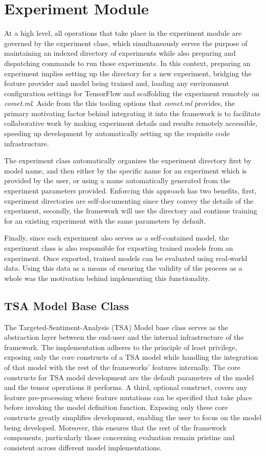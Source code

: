 \documentclass[12pt, a4paper]{report}
\theoremstyle{definition}
\theoremstyle{definition}%
\theoremstyle{definition}%
\theoremstyle{definition}%
\theoremstyle{definition}%
\theoremstyle{definition}%
\begin{document}
\section{Experiment Module}
At a high level, all operations that take place in the experiment module are governed by the experiment class, which simultaneously serves the purpose of maintaining an indexed directory of experiments while also preparing and dispatching commands to run those experiments. In this context, preparing an experiment implies setting up the directory for a new experiment, bridging the feature provider and model being trained and, loading any environment configuration settings for TensorFlow and scaffolding the experiment remotely on \textit{comet.ml}. Aside from the this tooling options that \textit{comet.ml} provides, the primary motivating factor behind integrating it into the framework is to facilitate collaborative work by making experiment details and results remotely accessible, speeding up development by automatically setting up the requisite code infrastructure.

The experiment class automatically organizes the experiment directory first by model name, and then either by the specific name for an experiment which is provided by the user, or using a name automatically generated from the experiment parameters provided. Enforcing this approach has two benefits, first, experiment directories are self-documenting since they convey the details of the experiment, secondly, the framework will use the directory and continue training for an existing experiment with the same parameters by default.

Finally, since each experiment also serves as a self-contained model, the experiment class is also responsible for exporting trained models from an experiment. Once exported, trained models can be evaluated using real-world data. Using this data as a means of ensuring the validity of the process as a whole was the motivation behind implementing this functionality.

\subsection{TSA Model Base Class}
The Targeted-Sentiment-Analysis (TSA) Model base class serves as the abstraction layer between the end-user and the internal infrastructure of the framework. The implementation adheres to the principle of least privilege, exposing only the core constructs of a TSA model while handling the integration of that model with the rest of the frameworks' features internally. The core constructs for TSA model development are the default parameters of the model and the tensor operations it performs. A third, optional construct, covers any feature pre-processing where feature mutations can be specified that take place before invoking the model definition function. Exposing only these core constructs greatly simplifies development, enabling the user to focus on the model being developed. Moreover, this ensures that the rest of the framework components, particularly those concerning evaluation remain pristine and consistent across different model implementations. 
\end{document}
